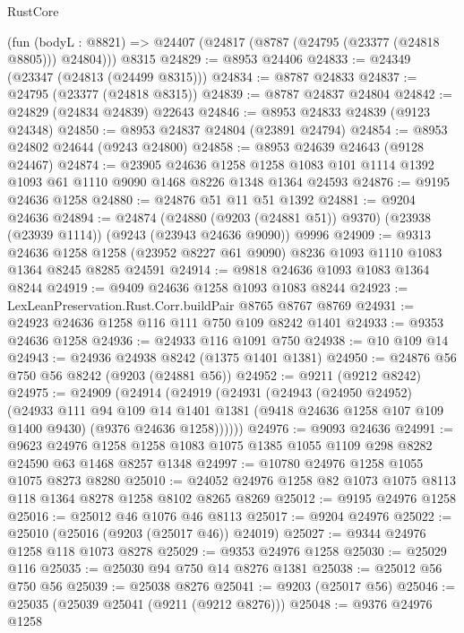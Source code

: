 \begin{lexlean}{RustCore}
\begin{coremodule}
    (fun (bodyL : @8821) => @24407 (@24817 (@8787 (@24795 (@23377 (@24818 @8805))) @24804)))
    @8315
@24829 := @8953 @24406
@24833 := @24349 (@23347 (@24813 (@24499 @8315)))
@24834 := @8787 @24833
@24837 := @24795 (@23377 (@24818 @8315))
@24839 := @8787 @24837 @24804
@24842 := @24829 (@24834 @24839) @22643
@24846 := @8953 @24833 @24839 (@9123 @24348)
@24850 := @8953 @24837 @24804 (@23891 @24794)
@24854 := @8953 @24802 @24644 (@9243 @24800)
@24858 := @8953 @24639 @24643 (@9128 @24467)
@24874 := @23905
    @24636
    @1258
    @1258
    @1083
    @101
    @1114
    @1392
    @1093
    @61
    @1110
    @9090
    @1468
    @8226
    @1348
    @1364
    @24593
@24876 := @9195 @24636 @1258
@24880 := @24876 @51 @11 @51 @1392
@24881 := @9204 @24636
@24894 := @24874
    (@24880 (@9203 (@24881 @51)) @9370)
    (@23938 (@23939 @1114))
    (@9243 (@23943 @24636 @9090))
    @9996
@24909 := @9313
    @24636
    @1258
    @1258
    (@23952 @8227 @61 @9090)
    @8236
    @1093
    @1110
    @1083
    @1364
    @8245
    @8285
    @24591
@24914 := @9818 @24636 @1093 @1083 @1364 @8244
@24919 := @9409 @24636 @1258 @1093 @1083 @8244
@24923 := LexLeanPreservation.Rust.Corr.buildPair @8765 @8767 @8769
@24931 := @24923 @24636 @1258 @116 @111 @750 @109 @8242 @1401
@24933 := @9353 @24636 @1258
@24936 := @24933 @116 @1091 @750
@24938 := @10 @109 @14
@24943 := @24936 @24938 @8242 (@1375 @1401 @1381)
@24950 := @24876 @56 @750 @56 @8242 (@9203 (@24881 @56))
@24952 := @9211 (@9212 @8242)
@24975 := @24909
    (@24914
      (@24919
        (@24931
          (@24943
            (@24950 @24952)
            (@24933
              @111
              @94
              @109
              @14
              @1401
              @1381
              (@9418 @24636 @1258 @107 @109 @1400 @9430)
              (@9376 @24636 @1258))))))
@24976 := @9093 @24636
@24991 := @9623
    @24976
    @1258
    @1258
    @1083
    @1075
    @1385
    @1055
    @1109
    @298
    @8282
    @24590
    @63
    @1468
    @8257
    @1348
@24997 := @10780 @24976 @1258 @1055 @1075 @8273 @8280
@25010 := @24052 @24976 @1258 @82 @1073 @1075 @8113 @118 @1364 @8278 @1258 @8102 @8265 @8269
@25012 := @9195 @24976 @1258
@25016 := @25012 @46 @1076 @46 @8113
@25017 := @9204 @24976
@25022 := @25010 (@25016 (@9203 (@25017 @46)) @24019)
@25027 := @9344 @24976 @1258 @118 @1073 @8278
@25029 := @9353 @24976 @1258
@25030 := @25029 @116
@25035 := @25030 @94 @750 @14 @8276 @1381
@25038 := @25012 @56 @750 @56
@25039 := @25038 @8276
@25041 := @9203 (@25017 @56)
@25046 := @25035 (@25039 @25041 (@9211 (@9212 @8276)))
@25048 := @9376 @24976 @1258

\end{coremodule}
\end{lexlean}
